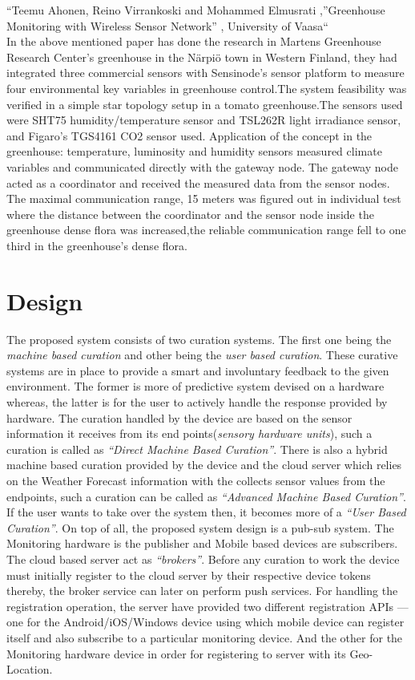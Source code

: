 \documentclass[10pt]{article}
\begin{document}
“Teemu Ahonen, Reino Virrankoski and Mohammed Elmusrati ,”Greenhouse Monitoring with Wireless Sensor Network” , University of Vaasa“\\


In the above mentioned paper has done the research in Martens Greenhouse Research Center’s greenhouse in the Närpiö town in Western Finland, they had integrated three commercial sensors with Sensinode’s sensor platform to measure four environmental key variables in greenhouse control.The system feasibility was verified in a simple star topology setup in a tomato greenhouse.The sensors used were SHT75 humidity/temperature sensor and TSL262R light irradiance sensor, and Figaro’s TGS4161 CO2 sensor used. Application of the concept in the greenhouse: temperature, luminosity and humidity sensors measured climate variables and communicated directly with the gateway node. The gateway node acted as a coordinator and received the measured data from the sensor nodes. The maximal communication range, 15 meters was figured out in individual test where the distance between the coordinator and the sensor node inside the greenhouse dense flora was increased,the reliable communication range fell to one third in the greenhouse’s dense flora. 

\section*{Design}

The proposed system consists of two curation systems. The first one being the \emph{machine based curation} and other being the \emph{user based curation}. These curative systems are in place to provide a smart and involuntary feedback to the given environment. The former is more of predictive system devised on a hardware whereas, the latter is for the user to actively handle the response provided by hardware. The curation handled by the device are based on the sensor information it receives from its end points(\emph{sensory hardware units}), such a curation is called as \emph{``Direct Machine Based Curation''}. There is also a hybrid machine based curation provided by the device and the cloud server which relies on the Weather Forecast information with the collects sensor values from the endpoints, such a curation can be called as \emph{``Advanced Machine Based Curation''}. If the user wants to take over the system then, it becomes more of a \emph{``User Based Curation''}. On top of all, the proposed system design is a pub-sub system. The Monitoring hardware is the publisher and Mobile based devices are subscribers. The cloud based server act as \emph{``brokers''}. Before any curation to work the device must initially register to the cloud server by their respective device tokens thereby, the broker service can later on perform push services. For handling the registration operation, the server have provided two different registration APIs --- one for the Android/iOS/Windows device using which mobile device can register itself and also subscribe to a particular monitoring device. And the other for the Monitoring hardware device in order for registering to server with its Geo-Location.
\end{document}
